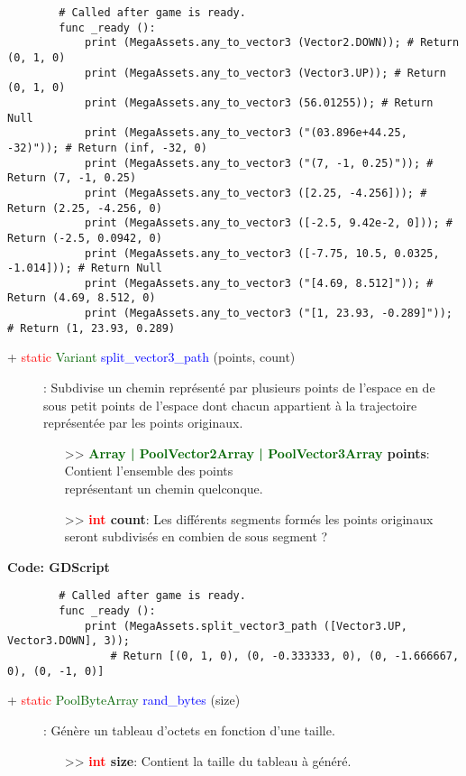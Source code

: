\documentclass[a4paper, 11pt]{article}
\begin{document}
	\begin{lstlisting}
		# Called after game is ready.
		func _ready ():
			print (MegaAssets.any_to_vector3 (Vector2.DOWN)); # Return (0, 1, 0)
			print (MegaAssets.any_to_vector3 (Vector3.UP)); # Return (0, 1, 0)
			print (MegaAssets.any_to_vector3 (56.01255)); # Return Null
			print (MegaAssets.any_to_vector3 ("(03.896e+44.25, -32)")); # Return (inf, -32, 0)
			print (MegaAssets.any_to_vector3 ("(7, -1, 0.25)")); # Return (7, -1, 0.25)
			print (MegaAssets.any_to_vector3 ([2.25, -4.256])); # Return (2.25, -4.256, 0)
			print (MegaAssets.any_to_vector3 ([-2.5, 9.42e-2, 0])); # Return (-2.5, 0.0942, 0)
			print (MegaAssets.any_to_vector3 ([-7.75, 10.5, 0.0325, -1.014])); # Return Null
			print (MegaAssets.any_to_vector3 ("[4.69, 8.512]")); # Return (4.69, 8.512, 0)
			print (MegaAssets.any_to_vector3 ("[1, 23.93, -0.289]")); # Return (1, 23.93, 0.289)
	\end{lstlisting}
	\begin{description}
		\item [+ \textcolor{red}{static} \textcolor{darkgreen}{Variant} \textcolor{blue}
		{split\_vector3\_path} (points, count)]: Subdivise un chemin représenté par plusieurs points de 
		l'espace en de sous petit points de l'espace dont chacun appartient à la trajectoire \\représentée
		par les points originaux.
		\begin{itemize}
			\item [>> \textbf{\textcolor{darkgreen}{Array | PoolVector2Array | PoolVector3Array} points}:]
			Contient l'ensemble des points \\représentant un chemin quelconque.
			\item [>> \textbf{\textcolor{red}{int} count}:] Les différents segments formés les points 
			originaux seront subdivisés en combien de sous segment ?\\
		\end{itemize}
	\end{description}
	\textbf{Code: GDScript}
	\begin{lstlisting}
		# Called after game is ready.
		func _ready ():
			print (MegaAssets.split_vector3_path ([Vector3.UP, Vector3.DOWN], 3));
				# Return [(0, 1, 0), (0, -0.333333, 0), (0, -1.666667, 0), (0, -1, 0)]
	\end{lstlisting}
	\begin{description}
		\item [+ \textcolor{red}{static} \textcolor{darkgreen}{PoolByteArray} \textcolor{blue}
		{rand\_bytes} (size)]: Génère un tableau d'octets en fonction d'une taille.
		\begin{itemize}
			\item [>> \textbf{\textcolor{red}{int} size}:] Contient la taille du tableau à généré.\\
		\end{itemize}
	\end{description}
\end{document}
